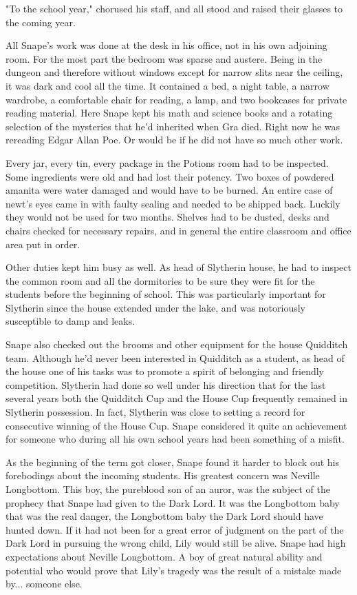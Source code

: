 \documentclass[a4paper,11pt]{article}
\begin{document}
"To the school year," chorused his staff, and all stood and raised their glasses to the coming year.

All Snape's work was done at the desk in his office, not in his own adjoining room. For the most part the bedroom was sparse and austere. Being in the dungeon and therefore without windows except for narrow slits near the ceiling, it was dark and cool all the time. It contained a bed, a night table, a narrow wardrobe, a comfortable chair for reading, a lamp, and two bookcases for private reading material. Here Snape kept his math and science books and a rotating selection of the mysteries that he'd inherited when Gra died. Right now he was rereading Edgar Allan Poe. Or would be if he did not have so much other work.

Every jar, every tin, every package in the Potions room had to be inspected. Some ingredients were old and had lost their potency. Two boxes of powdered amanita were water damaged and would have to be burned. An entire case of newt's eyes came in with faulty sealing and needed to be shipped back. Luckily they would not be used for two months. Shelves had to be dusted, desks and chairs checked for necessary repairs, and in general the entire classroom and office area put in order.

Other duties kept him busy as well. As head of Slytherin house, he had to inspect the common room and all the dormitories to be sure they were fit for the students before the beginning of school. This was particularly important for Slytherin since the house extended under the lake, and was notoriously susceptible to damp and leaks.

Snape also checked out the brooms and other equipment for the house Quidditch team. Although he'd never been interested in Quidditch as a student, as head of the house one of his tasks was to promote a spirit of belonging and friendly competition. Slytherin had done so well under his direction that for the last several years both the Quidditch Cup and the House Cup frequently remained in Slytherin possession. In fact, Slytherin was close to setting a record for consecutive winning of the House Cup. Snape considered it quite an achievement for someone who during all his own school years had been something of a misfit.

As the beginning of the term got closer, Snape found it harder to block out his forebodings about the incoming students. His greatest concern was Neville Longbottom. This boy, the pureblood son of an auror, was the subject of the prophecy that Snape had given to the Dark Lord. It was the Longbottom baby that was the real danger, the Longbottom baby the Dark Lord should have hunted down. If it had not been for a great error of judgment on the part of the Dark Lord in pursuing the wrong child, Lily would still be alive. Snape had high expectations about Neville Longbottom. A boy of great natural ability and potential who would prove that Lily's tragedy was the result of a mistake made by... someone else.
\end{document}

